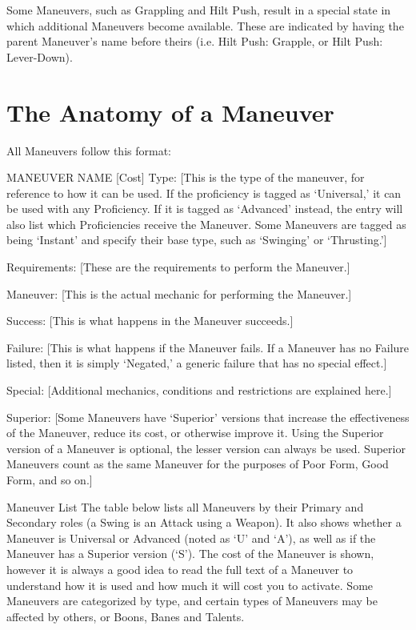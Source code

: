 \documentclass[oneside,11pt,english]{book}
\begin{document}
Some Maneuvers, such as Grappling and Hilt Push, result in a special state in which additional Maneuvers become available. These are indicated by having the parent Maneuver’s name before theirs (i.e. Hilt Push: Grapple, or Hilt Push: Lever-Down).

\section{\label{sec:Maneuvers}The Anatomy of a Maneuver}
All Maneuvers follow this format:


MANEUVER NAME [Cost]
Type: [This is the type of the maneuver, for reference to how it can be used. If the proficiency is tagged as ‘Universal,’ it can be used with any Proficiency. If it is tagged as ‘Advanced’ instead, the entry will also list which Proficiencies receive the Maneuver. Some Maneuvers are tagged as being ‘Instant’ and specify their base type, such as ‘Swinging’ or ‘Thrusting.’]


Requirements: [These are the requirements to perform the Maneuver.]


Maneuver: [This is the actual mechanic for performing the Maneuver.]


Success: [This is what happens in the Maneuver succeeds.]


Failure: [This is what happens if the Maneuver fails. If a Maneuver has no Failure listed, then it is simply ‘Negated,’ a generic failure that has no special effect.]


Special: [Additional mechanics, conditions and restrictions are explained here.]


Superior: [Some Maneuvers have ‘Superior’ versions that increase the effectiveness of the Maneuver, reduce its cost, or otherwise improve it. Using the Superior version of a Maneuver is optional, the lesser version can always be used. Superior Maneuvers count as the same Maneuver for the purposes of Poor Form, Good Form, and so on.]


Maneuver List 
The table below lists all Maneuvers by their Primary and Secondary roles (a Swing is an Attack using a 
Weapon). It also shows whether a Maneuver is Universal or Advanced (noted as ‘U’ and ‘A’), as well as 
if the Maneuver has a Superior version (‘S’). The cost of the Maneuver is shown, however it is always a 
good idea to read the full text of a Maneuver to understand how it is used and how much it will cost you 
to activate. Some Maneuvers are categorized by type, and certain types of Maneuvers may be affected by 
others, or Boons, Banes and Talents. 
\end{document}
